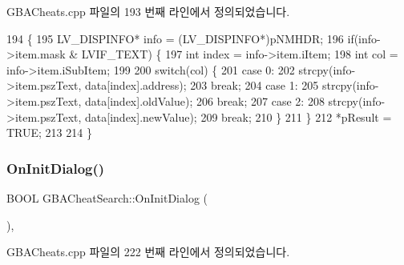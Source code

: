 G\+B\+A\+Cheats.\+cpp 파일의 193 번째 라인에서 정의되었습니다.


\begin{DoxyCode}
194 \{
195   LV\_DISPINFO* info = (LV\_DISPINFO*)pNMHDR;
196   \textcolor{keywordflow}{if}(info->item.mask & LVIF\_TEXT) \{
197     \textcolor{keywordtype}{int} index = info->item.iItem;
198     \textcolor{keywordtype}{int} col = info->item.iSubItem;
199     
200     \textcolor{keywordflow}{switch}(col) \{
201     \textcolor{keywordflow}{case} 0:
202       strcpy(info->item.pszText, data[index].address);
203       \textcolor{keywordflow}{break};
204     \textcolor{keywordflow}{case} 1:
205       strcpy(info->item.pszText, data[index].oldValue);
206       \textcolor{keywordflow}{break};
207     \textcolor{keywordflow}{case} 2:
208       strcpy(info->item.pszText, data[index].newValue);
209       \textcolor{keywordflow}{break};
210     \}
211   \}
212   *pResult = TRUE;
213 
214 \}
\end{DoxyCode}
\mbox{\label{class_g_b_a_cheat_search_a29ff71ddc116276ad183d91e93d69426}} 
\subsubsection{\texorpdfstring{On\+Init\+Dialog()}{OnInitDialog()}}
{\footnotesize\ttfamily B\+O\+OL G\+B\+A\+Cheat\+Search\+::\+On\+Init\+Dialog (\begin{DoxyParamCaption}{ }\end{DoxyParamCaption})\hspace{0.3cm}{\ttfamily [protected]}, {\ttfamily [virtual]}}



G\+B\+A\+Cheats.\+cpp 파일의 222 번째 라인에서 정의되었습니다.


